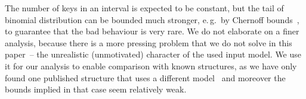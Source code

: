 The number of keys in an interval is expected to be constant, but the tail of binomial distribution can be bounded much stronger, e.\,g.~by Chernoff bounds~\cite[chapter~4.1]{randomAlgs}, to guarantee that the bad behaviour is very rare.
We do not elaborate on a finer analysis, because there is a more pressing problem that we do not solve in this paper~-- the unrealistic (unmotivated) character of the used input model.
We use it for our analysis to enable comparison with known structures, as we have only found one published structure that uses a different model~\cite{DemaineJP04} and moreover the bounds implied in that case seem relatively weak. %



